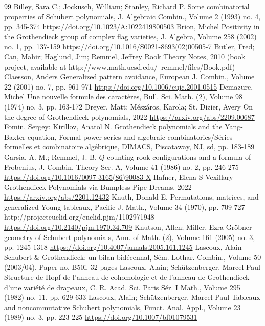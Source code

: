 \documentclass[10pt]{amsart}
\theoremstyle{plain}
\theoremstyle{plain}
\theoremstyle{definition}
\theoremstyle{definition}
\theoremstyle{definition}
\theoremstyle{plain}
\theoremstyle{plain}
\theoremstyle{plain}
\theoremstyle{plain}
\theoremstyle{plain}
\theoremstyle{remark}
\theoremstyle{remark}
\theoremstyle{plain}
\theoremstyle{plain}
\begin{document}
\begin{thebibliography}{99}
 Billey, Sara C.; Jockusch, William; Stanley, Richard P. Some combinatorial properties of Schubert polynomials, J. Algebraic Combin., Volume 2 (1993) no. 4, pp. 345-374 \url{https://doi.org/10.1023/A:1022419800503}
 Brion, Michel Positivity in the Grothendieck group of complex flag varieties, J. Algebra, Volume 258 (2002) no. 1, pp. 137-159 \url{https://doi.org/10.1016/S0021-8693(02)00505-7}
 Butler, Fred; Can, Mahir; Haglund, Jim; Remmel, Jeffrey Rook Theory Notes, 2010 (book project, available at http://www.math.ucsd.edu/~remmel/files/Book.pdf)
 Claesson, Anders Generalized pattern avoidance, European J. Combin., Volume 22 (2001) no. 7, pp. 961-971 \url{https://doi.org/10.1006/eujc.2001.0515}
 Demazure, Michel Une nouvelle formule des caractères, Bull. Sci. Math. (2), Volume 98 (1974) no. 3, pp. 163-172
 Dreyer, Matt; Mészáros, Karola; St. Dizier, Avery On the degree of Grothendieck polynomials, 2022 \url{https://arxiv.org/abs/2209.00687}
 Fomin, Sergey; Kirillov, Anatol N. Grothendieck polynomials and the Yang-Baxter equation, Formal power series and algebraic combinatorics/Séries formelles et combinatoire algébrique, DIMACS, Piscataway, NJ, sd, pp. 183-189
 Garsia, A. M.; Remmel, J. B. $Q$-counting rook configurations and a formula of Frobenius, J. Combin. Theory Ser. A, Volume 41 (1986) no. 2, pp. 246-275 \url{https://doi.org/10.1016/0097-3165(86)90083-X}
 Hafner, Elena S Vexillary Grothendieck Polynomials via Bumpless Pipe Dreams, 2022 \url{https://arxiv.org/abs/2201.12432}
 Knuth, Donald E. Permutations, matrices, and generalized Young tableaux, Pacific J. Math., Volume 34 (1970), pp. 709-727 http://projecteuclid.org/euclid.pjm/1102971948 \url{https://doi.org/10.2140/pjm.1970.34.709}
 Knutson, Allen; Miller, Ezra Gröbner geometry of Schubert polynomials, Ann. of Math. (2), Volume 161 (2005) no. 3, pp. 1245-1318 \url{https://doi.org/10.4007/annals.2005.161.1245}
 Lascoux, Alain Schubert \& Grothendieck: un bilan bidécennal, Sém. Lothar. Combin., Volume 50 (2003/04), Paper no. B50i, 32 pages
 Lascoux, Alain; Schützenberger, Marcel-Paul Structure de Hopf de l’anneau de cohomologie et de l’anneau de Grothendieck d’une variété de drapeaux, C. R. Acad. Sci. Paris Sér. I Math., Volume 295 (1982) no. 11, pp. 629-633
 Lascoux, Alain; Schützenberger, Marcel-Paul Tableaux and noncommutative Schubert polynomials, Funct. Anal. Appl., Volume 23 (1989) no. 3, pp. 223-225 \url{https://doi.org/10.1007/bf01079531}

\end{thebibliography}
\end{document}
